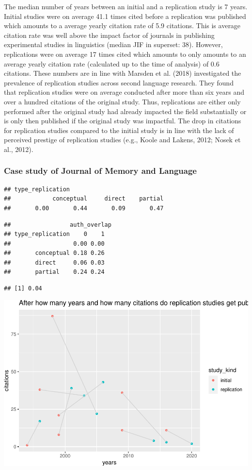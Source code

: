 \documentclass[]{elsarticle} %
\begin{document}
The median number of years between an initial and a replication study is
7 years. Initial studies were on average 41.1 times cited before a
replication was published which amounts to a average yearly citation
rate of 5.9 citations. This is average citation rate was well above the
impact factor of journals in publishing experimental studies in
linguistics (median JIF in superset: 38). However, replications were on
average 17 times cited which amounts to only amounts to an average
yearly citation rate (calculated up to the time of analysis) of 0.6
citations. These numbers are in line with Marsden et al. (2018)
investigated the prevalence of replication studies across second
language research. They found that replication studies were on average
conducted after more than six years and over a hundred citations of the
original study. Thus, replications are either only performed after the
original study had already impacted the field substantially or is only
then published if the original study was impactful. The drop in
citations for replication studies compared to the initial study is in
line with the lack of perceived prestige of replication studies (e.g.,
Koole and Lakens, 2012; Nosek et al., 2012).

\hypertarget{case-study-of-journal-of-memory-and-language}{%
\subsubsection{Case study of Journal of Memory and
Language}\label{case-study-of-journal-of-memory-and-language}}

\begin{verbatim}
## type_replication
##            conceptual     direct    partial 
##       0.00       0.44       0.09       0.47
\end{verbatim}

\begin{verbatim}
##                 auth_overlap
## type_replication    0    1
##                  0.00 0.00
##       conceptual 0.18 0.26
##       direct     0.06 0.03
##       partial    0.24 0.24
\end{verbatim}

\begin{verbatim}
## [1] 0.04
\end{verbatim}

\includegraphics{ReplicationLing_files/figure-latex/plot cit and years direct-1.pdf}
\end{document}
